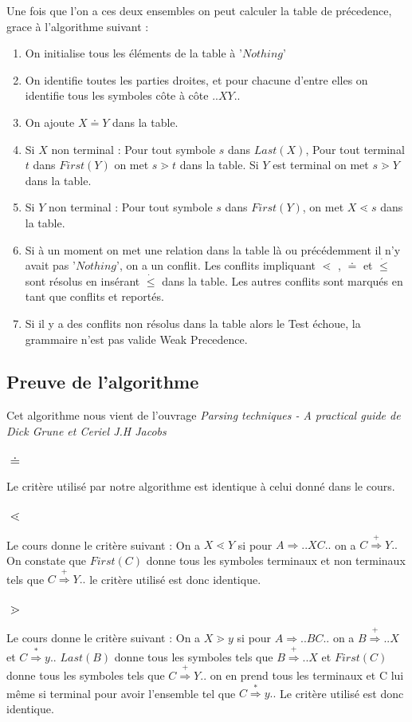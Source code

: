 		Une fois que l'on a ces deux ensembles on peut calculer la table de précedence, grace à l'algorithme suivant :
		\begin{enumerate}
			\item On initialise tous les éléments de la table à '$Nothing$'
			\item On identifie toutes les parties droites, et pour chacune d'entre elles on identifie tous les
			symboles côte à côte $..XY..$
			\item On ajoute $X\doteq Y$ dans la table.
			\item Si $X$ non terminal : Pour tout symbole $s$ dans $Last(X)$, Pour tout terminal $t$ dans $First(Y)$
				on met $s\gtrdot t$ dans la table. Si $Y$ est terminal on met $s\gtrdot Y$ dans la table.
			\item Si $Y$ non terminal : Pour tout symbole $s$ dans $First(Y)$, on met $X \lessdot s$ dans la table.
			\item Si à un moment on met une relation dans la table là ou précédemment il n'y avait pas '$Nothing$',
				on a un conflit. Les conflits impliquant $\lessdot$ , $\doteq$ et $\dot{\leq}$ sont résolus en insérant $\dot{\leq}$ dans
				la table. Les autres conflits sont marqués en tant que conflits et reportés. 
			\item Si il y a des conflits non résolus dans la table alors le Test échoue, la grammaire n'est pas valide
			Weak Precedence.
		\end{enumerate}
	\subsection{Preuve de l'algorithme}
		Cet algorithme nous vient de l'ouvrage \emph{Parsing techniques - A practical guide de Dick Grune et Ceriel J.H Jacobs}
		\subsubsection{$\doteq$} Le critère utilisé par notre algorithme est identique à celui donné dans le cours.
		\subsubsection{$\lessdot$} Le cours donne le critère suivant : On a $X\lessdot Y$ si pour $A \Longrightarrow..XC..$ on a $C \overset{+}{\Longrightarrow} Y..$ On constate
		que $First(C)$ donne tous les symboles terminaux et non terminaux tels que $C \overset{+}{\Longrightarrow} Y..$ le critère utilisé est donc
		identique.
		\subsubsection{$\gtrdot$} Le cours donne le critère suivant : On a $X\gtrdot y$ si pour $A\Longrightarrow..BC..$ on 
		a $B \overset{+}{\Longrightarrow} ..X$ et $C \overset{*}{\Longrightarrow} y..$
		$Last(B)$ donne tous les symboles tels que $B \overset{+}{\Longrightarrow}..X$ et $First(C)$ donne tous les symboles tels que 
		$C \overset{+}{\Longrightarrow} Y..$ 
		on en prend tous les terminaux et C lui même si terminal pour avoir l'ensemble tel que $C \overset{*}{\Longrightarrow} y..$ Le critère utilisé
		est donc identique. 

